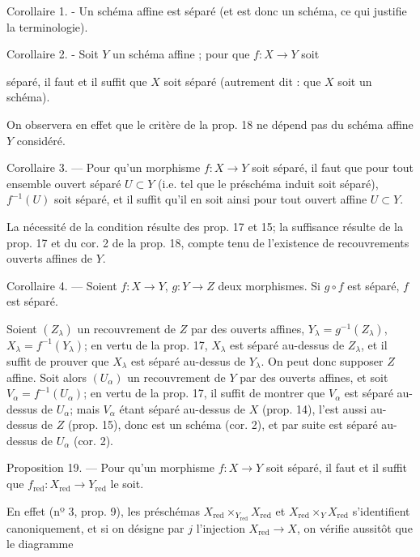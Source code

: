 Corollaire 1. - Un schéma affine est séparé (et est donc un schéma, ce qui justifie la terminologie).

Corollaire 2. - Soit $Y$ un schéma affine ; pour que $f : X \to Y$ soit

\newpage


séparé, il faut et il suffit que $X$ soit séparé (autrement dit : que $X$ soit un schéma).

On observera en effet que le critère de la prop. 18 ne dépend pas du schéma affine $Y$ considéré.

Corollaire 3. — Pour qu'un morphisme $f : X \to Y$ soit séparé, il faut que pour tout ensemble ouvert séparé $U \subset Y$ (i.e. tel que le préschéma induit soit séparé), $f^{-1}(U)$ soit séparé, et il suffit qu'il en soit ainsi pour tout ouvert affine $U \subset Y$.

La nécessité de la condition résulte des prop. 17 et 15; la suffisance résulte de la prop. 17 et du cor. 2 de la prop. 18, compte tenu de l'existence de recouvrements ouverts affines de $Y$.

Corollaire 4. — Soient $f : X \to Y$, $g : Y \to Z$ deux morphismes. Si $g \circ f$ est séparé, $f$ est séparé.

Soient $(Z_\lambda)$ un recouvrement de $Z$ par des ouverts affines, $Y_\lambda = g^{-1}(Z_\lambda)$, $X_\lambda = f^{-1}(Y_\lambda)$; en vertu de la prop. 17, $X_\lambda$ est séparé au-dessus de $Z_\lambda$, et il suffit de prouver que $X_\lambda$ est séparé au-dessus de $Y_\lambda$. On peut donc supposer $Z$ affine. Soit alors $(U_\alpha)$ un recouvrement de $Y$ par des ouverts affines, et soit $V_\alpha = f^{-1}(U_\alpha)$; en vertu de la prop. 17, il suffit de montrer que $V_\alpha$ est séparé au-dessus de $U_\alpha$; mais $V_\alpha$ étant séparé au-dessus de $X$ (prop. 14), l'est aussi au-dessus de $Z$ (prop. 15), donc est un schéma (cor. 2), et par suite est séparé au-dessus de $U_\alpha$ (cor. 2).

Proposition 19. — Pour qu'un morphisme $f : X \to Y$ soit séparé, il faut et il suffit que $f_{\operatorname{red}} : X_{\operatorname{red}} \to Y_{\operatorname{red}}$ le soit.

En effet (nº 3, prop. 9), les préschémas $X_{\operatorname{red}} \times_{Y_{\operatorname{red}}} X_{\operatorname{red}}$ et $X_{\operatorname{red}} \times_Y X_{\operatorname{red}}$ s'identifient canoniquement, et si on désigne par $j$ l'injection $X_{\operatorname{red}} \to X$, on vérifie aussitôt que le diagramme

